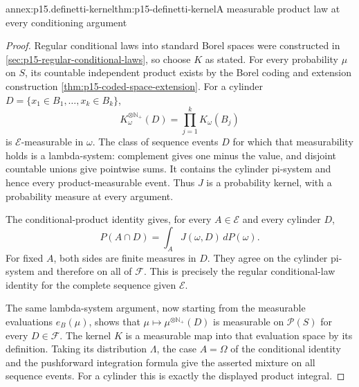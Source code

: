 \begin{annexitem}{annex:p15.definetti-kernel}{thm:p15-definetti-kernel}{A measurable product law at every conditioning argument}
\begin{proof}
Regular conditional laws into standard Borel spaces were constructed in
\cref{sec:p15-regular-conditional-laws}, so choose \(K\) as stated.
For every probability \(\mu\) on \(S\), its countable independent
product exists by the Borel coding and extension construction
\cref{thm:p15-coded-space-extension}.
For a cylinder \(D=\{x_1\in B_1,\ldots,x_k\in B_k\}\),
\[
                        K_\omega^{\otimes\mathbb N_+}(D)
                                      =\prod_{j=1}^kK_\omega(B_j)
\]
is \(\mathcal E\)-measurable in \(\omega\).
The class of sequence events \(D\) for which that measurability holds
is a lambda-system: complement gives one minus the value, and disjoint
countable unions give pointwise sums.
It contains the cylinder pi-system and hence every product-measurable
event. Thus \(J\) is a probability kernel, with a probability measure
at every argument.

The conditional-product identity gives, for every \(A\in\mathcal E\)
and every cylinder \(D\),
\[
                          P(A\cap D)=\int_AJ(\omega,D)\,dP(\omega).
\]
For fixed \(A\), both sides are finite measures in \(D\).
They agree on the cylinder pi-system and therefore on all of
\(\mathcal F\). This is precisely the regular conditional-law identity
for the complete sequence given \(\mathcal E\).

The same lambda-system argument, now starting from the measurable
evaluations \(e_B(\mu)\), shows that
\(\mu\mapsto\mu^{\otimes\mathbb N_+}(D)\) is measurable on
\(\mathscr P(S)\) for every \(D\in\mathcal F\).
The kernel \(K\) is a measurable map into that evaluation space
by its definition. Taking its distribution \(\Lambda\), the case
\(A=\Omega\) of the conditional identity and the pushforward
integration formula give the asserted mixture on all sequence events.
For a cylinder this is exactly the displayed product integral.
\end{proof}
\end{annexitem}

